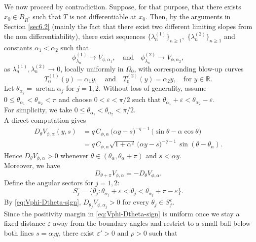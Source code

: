 \documentclass[
  sn-mathphys-num,
  colorlinks,
  linkcolor=darkmagenta,
  citecolor=rufous,
  urlcolor=zaffre,
  hypertexnames=false
]{sn-jnl}
\numberwithin{equation}{section}
\begin{document}
We now proceed by contradiction. Suppose, for that purpose, that there exists $x_0 \in B_{R^*}$ such that $T$ is not differentiable at $x_0$. Then, by the arguments in Section \ref{sec6.2} (mainly the fact that there exist two different limiting slopes from the non differentiability), there exist sequences $\{\lambda_n^{(1)}\}_{n\ge 1},$ $\{\lambda_n^{(2)}\}_{n\ge 1}
$ and constants $\alpha_1 < \alpha_2$ such that
$$
\phi_{\lambda_n}^{(1)} \to V_{\phi,\alpha_1}, \quad \text{and} \quad \phi_{\lambda_n}^{(2)} \to V_{\phi,\alpha_2},
$$
as $\lambda_n^{(1)}, \lambda_n^{(2)} \to 0$, locally uniformly in $\Omega_0$, with corresponding blow-up curves
$$
T_0^{(1)}(y) = \alpha_1 y, \quad \text{and} \quad T_0^{(2)}(y) = \alpha_2 y, \quad \text{for } y \in \mathbb{R}.
$$
Let $\theta_{\alpha_j} = \arctan \alpha_j$ for $j=1,2$. Without loss of generality, assume $0 \leq \theta_{\alpha_1} < \theta_{\alpha_2} < \pi$ and choose $0 < \varepsilon < \pi/2$ such that $\theta_{\alpha_1} + \varepsilon < \theta_{\alpha_2} - \varepsilon$.\\ For simplicity, we take $0 \leq \theta_{\alpha_1} < \theta_{\alpha_2} < \pi/2$.\\
A direct computation gives
\begin{equation}\label{eq:Vphi-Dtheta-sign}
\begin{aligned}
D_\theta V_{\phi,\alpha}(y,s)
&= q\,C_{\phi,\alpha}\,\bigl(\alpha y-s\bigr)^{-q-1}\,\bigl(\sin\theta-\alpha\cos\theta\bigr)
\\ &= q\,C_{\phi,\alpha}\sqrt{1+\alpha^2}\,\bigl(\alpha y-s\bigr)^{-q-1}\,\sin(\theta-\theta_\alpha).
\end{aligned}
\end{equation}
Hence $D_\theta V_{\phi,\alpha}>0$ whenever $\theta\in(\theta_\alpha,\theta_\alpha+\pi)$ and $s<\alpha y$.\\
Moreover, we have
\begin{equation}\label{eq:pi-antipodal}
D_{\theta+\pi}V_{\phi,\alpha}=-D_\theta V_{\phi,\alpha}.
\end{equation}
Define the angular sectors for $j=1,2$:
$$
S_j^\varepsilon = \{\theta_j : \theta_{\alpha_j} + \varepsilon < \theta_j < \theta_{\alpha_j} + \pi - \varepsilon\}.
$$
By \eqref{eq:Vphi-Dtheta-sign}, $D_{\theta_j}V_{\phi,\alpha_j}>0$ for every $\theta_j\in S_j^\varepsilon$.\\ Since the positivity margin in \eqref{eq:Vphi-Dtheta-sign} is uniform once we stay a fixed distance $\varepsilon$ away from the boundary angles and restrict to a small ball below both lines $s=\alpha_j y$, there exist $\varepsilon'>0$ and $\rho>0$ such that
\end{document}
